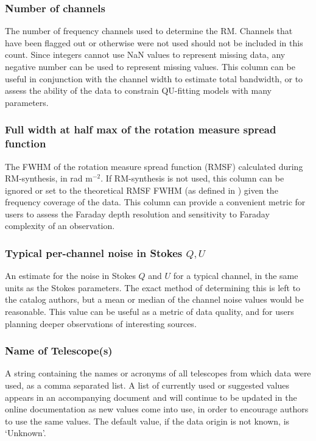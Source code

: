 \documentclass[10pt,modern]{aastex63}
\begin{document}
\subsubsection{Number of channels}
The number of frequency channels used to determine the RM. Channels that have been flagged out or otherwise were not used should not be included in this count. Since integers cannot use NaN values to represent missing data, any negative number can be used to represent missing values. This column can be useful in conjunction with the channel width to estimate total bandwidth, or to assess the ability of the data to constrain QU-fitting models with many parameters.

\subsubsection{Full width at half max of the rotation measure spread function}
The FWHM of the rotation measure spread function (RMSF) calculated during RM-synthesis, in rad m$^{-2}$. If RM-synthesis is not used, this column can be ignored or set to the theoretical RMSF FWHM (as defined in \citealt{Brentjens2005}) given the frequency coverage of the data. This column can provide a convenient metric for users to assess the Faraday depth resolution and sensitivity to Faraday complexity of an observation.

\subsubsection{Typical per-channel noise in Stokes $Q,U$}
An estimate for the noise in Stokes $Q$ and $U$ for a typical channel, in the same units as the Stokes parameters. The exact method of determining this is left to the catalog authors, but a mean or median of the channel noise values would be reasonable. This value can be useful as a metric of data quality, and for users planning deeper observations of interesting sources.

\subsubsection{Name of Telescope(s)}
A string containing the names or acronyms of all telescopes from which data were used, as a comma separated list. A list of currently used or suggested values appears in an accompanying document and will continue to be updated in the online documentation as new values come into use, in order to encourage authors to use the same values. The default value, if the data origin is not known, is `Unknown'.
\end{document}

